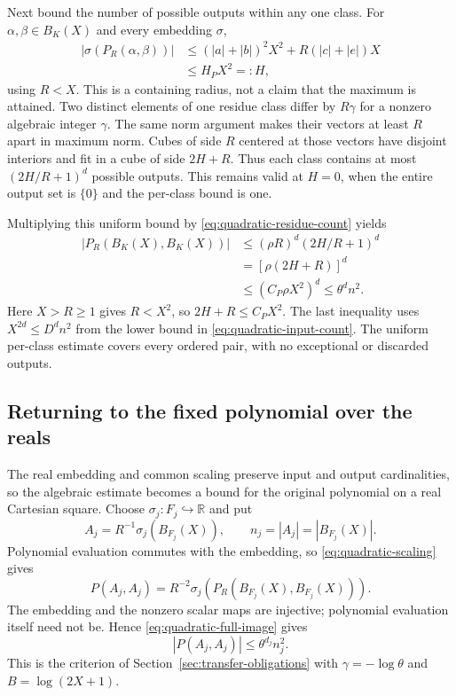 Next bound the number of possible outputs within any one class. For $\alpha,\beta\in B_K(X)$ and every embedding $\sigma$,
\[
\begin{aligned}
|\sigma(P_R(\alpha,\beta))|
&\le (|a|+|b|)^2X^2+R(|c|+|e|)X\\
&\le H_PX^2=:H,
\end{aligned}
\]
using $R<X$. This is a containing radius, not a claim that the maximum is attained. Two distinct elements of one residue class differ by $R\gamma$ for a nonzero algebraic integer $\gamma$. The same norm argument makes their vectors at least $R$ apart in maximum norm. Cubes of side $R$ centered at those vectors have disjoint interiors and fit in a cube of side $2H+R$. Thus each class contains at most $(2H/R+1)^d$ possible outputs. This remains valid at $H=0$, when the entire output set is $\{0\}$ and the per-class bound is one.

Multiplying this uniform bound by \eqref{eq:quadratic-residue-count} yields
\begin{equation}
\begin{aligned}
|P_R(B_K(X),B_K(X))|
&\le (\rho R)^d(2H/R+1)^d\\
&=[\rho(2H+R)]^d\\
&\le(C_P\rho X^2)^d
\le\theta^d n^2.
\end{aligned}
\label{eq:quadratic-full-image}
\end{equation}
Here $X>R\ge1$ gives $R<X^2$, so $2H+R\le C_PX^2$. The last inequality uses $X^{2d}\le D^dn^2$ from the lower bound in \eqref{eq:quadratic-input-count}. The uniform per-class estimate covers every ordered pair, with no exceptional or discarded outputs.

\subsection{Returning to the fixed polynomial over the reals}
\label{subsec:quadratic-conclusion}

The real embedding and common scaling preserve input and output cardinalities, so the algebraic estimate becomes a bound for the original polynomial on a real Cartesian square. Choose $\sigma_j:F_j\hookrightarrow\mathbb R$ and put
\[
A_j=R^{-1}\sigma_j(B_{F_j}(X)),
\qquad n_j=|A_j|=|B_{F_j}(X)|.
\]
Polynomial evaluation commutes with the embedding, so \eqref{eq:quadratic-scaling} gives
\[
P(A_j,A_j)
=R^{-2}\sigma_j\!\left(P_R(B_{F_j}(X),B_{F_j}(X))\right).
\]
The embedding and the nonzero scalar maps are injective; polynomial evaluation itself need not be. Hence \eqref{eq:quadratic-full-image} gives
\[
|P(A_j,A_j)|\le\theta^{d_j}n_j^2.
\]
This is the criterion of Section~\ref{sec:transfer-obligations} with $\gamma=-\log\theta$ and $B=\log(2X+1)$.

